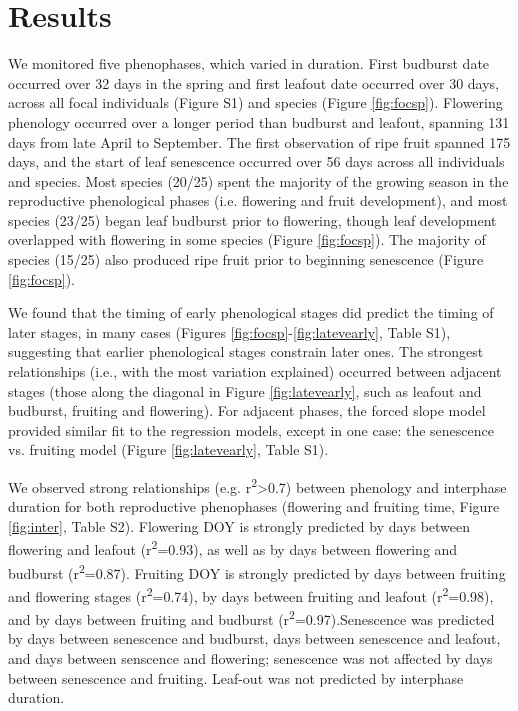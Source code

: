 \documentclass{article}
\begin{document}
\section* {Results}
\par We monitored five phenophases, which varied in duration. First budburst date occurred over 32 days in the spring and first leafout date occurred over 30 days, across all focal individuals (Figure S1) and species (Figure \ref{fig:focsp}). Flowering phenology occurred over a longer period than budburst and leafout, spanning 131 days from late April to September. The first observation of ripe fruit spanned 175 days, and the start of leaf senescence occurred over 56 days across all individuals and species. Most species (20/25) spent the majority of the growing season in the reproductive phenological phases (i.e. flowering and fruit development), and most species (23/25) began leaf budburst prior to flowering, though leaf development overlapped with flowering in some species (Figure \ref{fig:focsp}). The majority of species (15/25) also produced ripe fruit prior to beginning senescence (Figure \ref{fig:focsp}).
\par We found that the timing of early phenological stages did predict the timing of later stages, in many cases (Figures \ref{fig:focsp}-\ref{fig:latevearly}, Table S1), suggesting that earlier phenological stages constrain later ones. The strongest relationships (i.e., with the most variation explained) occurred between adjacent stages (those along the diagonal in Figure \ref{fig:latevearly}, such as leafout and budburst, fruiting and flowering). For adjacent phases, the forced slope model provided similar fit to the regression models, except in one case: the senescence vs. fruiting model (Figure \ref{fig:latevearly}, Table S1). 

\par We observed strong relationships (e.g. r\textsuperscript{2}>0.7) between phenology and interphase duration for both reproductive phenophases (flowering and fruiting time, Figure \ref{fig:inter}, Table S2). Flowering DOY is strongly predicted by days between flowering and leafout (r\textsuperscript{2}=0.93), as well as by days between flowering and budburst (r\textsuperscript{2}=0.87). Fruiting DOY is strongly predicted by days between fruiting and flowering stages (r\textsuperscript{2}=0.74), by days between fruiting and leafout (r\textsuperscript{2}=0.98), and by days between fruiting and budburst (r\textsuperscript{2}=0.97).Senescence was predicted by days between senescence and budburst, days between senescence and leafout, and days between senscence and flowering; senescence was not affected by days between senescence and fruiting.  Leaf-out was not predicted by interphase duration. 
\end{document}
